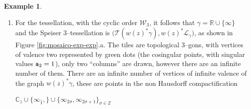 \documentclass[final,3p,times]{elsarticle}
\newcommand{\ZZ}{\ensuremath{{\mathbb Z}}}
\newcommand{\CC}{\ensuremath{{\mathbb C}}}
\newcommand{\RR}{\ensuremath{{\mathbb R}}}
\newcommand{\R}{\ensuremath{{\mathcal R}}}
\theoremstyle{definition}
\newtheorem{example}{Example}[section]
\begin{document}
\begin{example}
\begin{enumerate}[label=\alph*),leftmargin=*]
\noindent
The decomposition of $\R_{w(z)}$ into maximal domains of single--valuedness is
\begin{equation*}
\R_{w(z)} = 
\Bigg[
\bigcup_{\vartheta_1 \in\ZZ} \mathfrak{L}_{1,\vartheta_1}
\ \cup
\bigcup_{\vartheta_3 \in\ZZ}
\bigg(
\bigcup_{\vartheta_2= 1}^\infty 
\mathfrak{L}_{2, \vartheta_2}
\bigg)_{\vartheta_3}
\Bigg]
\, \Bigg/ \sim \, .
\end{equation*}


Considering the cyclic order 

\centerline{$\mathcal{W}_3=[0,1,\infty]$,}

\noindent 
the decomposition
of $\R_{w(z)}$ into an infinite number of maximal logarithmic towers 
and the unique soul is
\begin{equation*}
\R_{w(z)} = \bigg[
\underbrace{
\bigcup_{\vartheta=-\infty}^\infty \Big( 
\mathfrak{H}^+\backslash ( \overline{0 1} \cup  \overline{1 \infty}
\cup  \overline{\infty 0} ) 
\cup
\mathfrak{H}^-\backslash  ( \overline{0 1} \cup  \overline{1 \infty}
\cup  \overline{\infty 0} ) 
\Big)_\vartheta
}_{\text{soul}}
\quad
\bigcup_{\vartheta=-\infty}^\infty \Big( 
\underbrace{ 
\mathcal{T}^\circ_- (\infty, 0) 
}_{\text{logarithmic tower}}
\cup
\underbrace{ 
\mathcal{T}^\times_+ (\infty, 0) 
}_{\text{logarithmic tower}}
\Big)_\vartheta
\bigg] \, \Big/ \sim.
\end{equation*}


\noindent
Clearly, the soul is not a rational block.

\item
For the tessellation, with the cyclic order $\mathcal{W}_3$, it follows that
$\gamma=\RR\cup\{\infty\}$ and the Speiser $3$--tessellation is 
$\big( \mathscr{T}(w(z)^* \gamma),w(z)^* \mathcal{L}_\gamma \big)$, as shown in 
Figure \ref{fig:mosaico-exp-exp}.a. 
The tiles are topological $3$--gons, 
with vertices of valence two represented by 
green dots (the cosingular points, with singular values ${\tt a}_2=1$), 
only two ``columns'' are drawn, however there are an infinite number of them. 
There are an infinite number of vertices of infinite valence of 
the graph $w(z)^*\gamma$, these
are points in the non Hausdorff compactification 

\centerline{$\CC_z \cup \{ 
\infty_{\widehat{1}}, \} \cup 
\{  \infty_{2\sigma}, \infty_{2\sigma+1}  \}_{\sigma\in\ZZ}$}


\end{enumerate}
\end{example}
\end{document}
